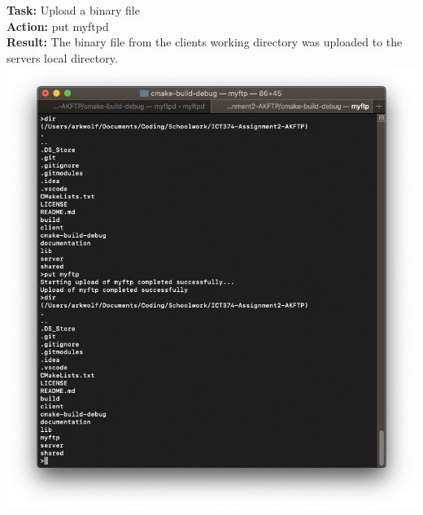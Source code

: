 \documentclass{article}
\begin{document}
\textbf{Task:} Upload a binary file\\
\textbf{Action:} put myftpd\\
\textbf{Result:} The binary file from the clients working directory was uploaded to the servers local directory.\\
\includegraphics[width=\textwidth]{testpictures/putbinary}
\end{document}

